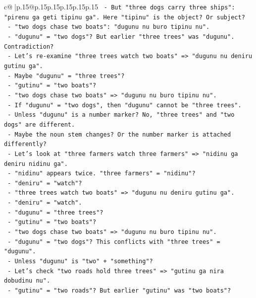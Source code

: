 \documentclass{article}
\begin{document}
{\begin{supertabular}{c@{$\;$}|p{.15\linewidth}@{}p{.15\linewidth}p{.15\linewidth}p{.15\linewidth}p{.15\linewidth}p{.15\linewidth}}
{{{\texttt{    {-} But "three dogs carry three ships": "pirenu ga geti tipinu ga". Here "tipinu" is the object? Or subject?} \\
\texttt{    {-} "two dogs chase two boats": "dugunu nu buro tipinu nu".} \\
\texttt{      {-} "dugunu" = "two dogs"? But earlier "three trees" was "dugunu". Contradiction?} \\
\texttt{      {-} Let's re{-}examine "three trees watch two boats" => "dugunu nu deniru gutinu ga".} \\
\texttt{        {-} Maybe "dugunu" = "three trees"?} \\
\texttt{        {-} "gutinu" = "two boats"?} \\
\texttt{      {-} "two dogs chase two boats" => "dugunu nu buro tipinu nu".} \\
\texttt{        {-} If "dugunu" = "two dogs", then "dugunu" cannot be "three trees".} \\
\texttt{        {-} Unless "dugunu" is a number marker? No, "three trees" and "two dogs" are different.} \\
\texttt{        {-} Maybe the noun stem changes? Or the number marker is attached differently?} \\
\texttt{        {-} Let's look at "three farmers watch three farmers" => "nidinu ga deniru nidinu ga".} \\
\texttt{          {-} "nidinu" appears twice. "three farmers" = "nidinu"?} \\
\texttt{          {-} "deniru" = "watch"?} \\
\texttt{        {-} "three trees watch two boats" => "dugunu nu deniru gutinu ga".} \\
\texttt{          {-} "deniru" = "watch".} \\
\texttt{          {-} "dugunu" = "three trees"?} \\
\texttt{          {-} "gutinu" = "two boats"?} \\
\texttt{        {-} "two dogs chase two boats" => "dugunu nu buro tipinu nu".} \\
\texttt{          {-} "dugunu" = "two dogs"? This conflicts with "three trees" = "dugunu".} \\
\texttt{          {-} Unless "dugunu" is "two" + "something"?} \\
\texttt{          {-} Let's check "two roads hold three trees" => "gutinu ga nira dobudinu nu".} \\
\texttt{            {-} "gutinu" = "two roads"? But earlier "gutinu" was "two boats"?} \\
}}}
\end{supertabular}}
\end{document}
